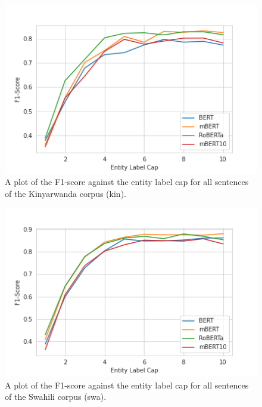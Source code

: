 \documentclass{article}
\begin{document}
\begin{figure}
    \centering
    \includegraphics[width=\columnwidth]{images/kin_models_plot.png}
    \caption{A plot of the F1-score against the entity label cap for all sentences of the Kinyarwanda corpus (kin).}
    \label{fig:kin_plot}
\end{figure}

\begin{figure}
    \centering
    \includegraphics[width=\columnwidth]{images/swa_models_plot.png}
    \caption{A plot of the F1-score against the entity label cap for all sentences of the Swahili corpus (swa).}
    \label{fig:swa_plot}
\end{figure}
\end{document}
